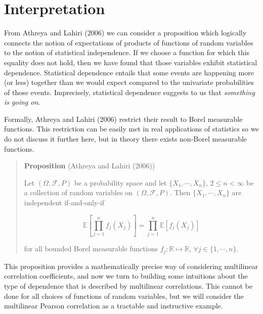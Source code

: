 \documentclass[
  letterpaper,
  DIV=11,
  numbers=noendperiod]{scrreprt}
\begin{document}
\section{Interpretation}\label{interpretation}

From Athreya and Lahiri (2006) we can consider a proposition which
logically connects the notion of expectations of products of functions
of random variables to the notion of statistical independence. If we
choose a function for which this equality does not hold, then we have
found that those variables exhibit statistical dependence. Statistical
dependence entails that some events are happening more (or less)
together than we would expect compared to the univariate probabilities
of those events. Imprecisely, statistical dependence suggests to us that
\emph{something is going on}.

\begin{tcolorbox}[enhanced jigsaw, colbacktitle=quarto-callout-note-color!10!white, bottomrule=.15mm, left=2mm, arc=.35mm, bottomtitle=1mm, coltitle=black, breakable, rightrule=.15mm, toptitle=1mm, opacityback=0, titlerule=0mm, title=\textcolor{quarto-callout-note-color}{\faInfo}\hspace{0.5em}{Note}, colframe=quarto-callout-note-color-frame, toprule=.15mm, leftrule=.75mm, opacitybacktitle=0.6, colback=white]

Formally, Athreya and Lahiri (2006) restrict their result to Borel
measurable functions. This restriction can be easily met in real
applications of statistics so we do not discuss it further here, but in
theory there exists non-Borel measurable functions.

\end{tcolorbox}

\begin{quote}
\textbf{Proposition} (Athreya and Lahiri (2006))

Let \((\Omega, \mathcal{F}, P)\) be a probability space and let
\(\{ X_1, \cdots, X_n \}\), \(2 \leq n < \infty\) be a collection of
random variables on \((\Omega, \mathcal{F}, P)\). Then
\(\{ X_1, \cdots, X_n \}\) are independent if-and-only-if

\[\mathbb{E}\left[ \prod_{j=1}^n f_j(X_j) \right] = \prod_{j=1}^n \mathbb{E} \left[ f_j(X_j)  \right]\]

for all bounded Borel measurable functions
\(f_j : \mathbb{R} \mapsto \mathbb{R}\),
\(\forall j \in \{1, \cdots, n \}\).
\end{quote}

This proposition provides a mathematically precise way of considering
multilinear correlation coefficients, and now we turn to building some
intuitions about the type of dependence that is described by multilinear
correlations. This cannot be done for all choices of functions of random
variables, but we will consider the multilinear Pearson correlation as a
tractable and instructive example.
\end{document}
